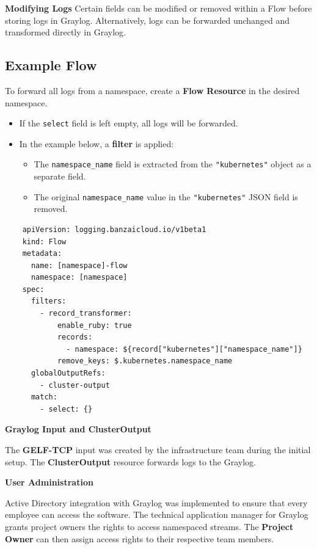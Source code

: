 \documentclass[../main.tex]{subfiles}
\begin{document}
\textbf{Modifying Logs}
Certain fields can be modified or removed within a Flow before storing logs in Graylog. Alternatively, logs can be forwarded unchanged and transformed directly in Graylog.

\subsection{Example Flow}
To forward all logs from a namespace, create a \textbf{Flow Resource} in the desired namespace.

\begin{itemize}
    \item If the \texttt{select} field is left empty, all logs will be forwarded.
    \item In the example below, a \textbf{filter} is applied:
    \begin{itemize}
        \item The \texttt{namespace\_name} field is extracted from the \texttt{"kubernetes"} object as a separate field.
        \item The original \texttt{namespace\_name} value in the \texttt{"kubernetes"} JSON field is removed.
    \end{itemize}
\end{itemize}

\begin{verbatim}
    apiVersion: logging.banzaicloud.io/v1beta1
    kind: Flow
    metadata:
      name: [namespace]-flow
      namespace: [namespace]
    spec:
      filters:
        - record_transformer:
            enable_ruby: true
            records:
              - namespace: ${record["kubernetes"]["namespace_name"]}
            remove_keys: $.kubernetes.namespace_name
      globalOutputRefs:
        - cluster-output
      match:
        - select: {}
\end{verbatim}

\textbf{Graylog Input and ClusterOutput}

The \textbf{GELF-TCP} input was created by the infrastructure team during the initial setup. The \textbf{ClusterOutput} resource forwards logs to the Graylog.

\textbf{User Administration}

Active Directory integration with Graylog was implemented to ensure that every employee can access the software. The technical application manager for Graylog grants project owners the rights to access namespaced streams. The \textbf{Project Owner} can then assign access rights to their respective team members.
\end{document}
